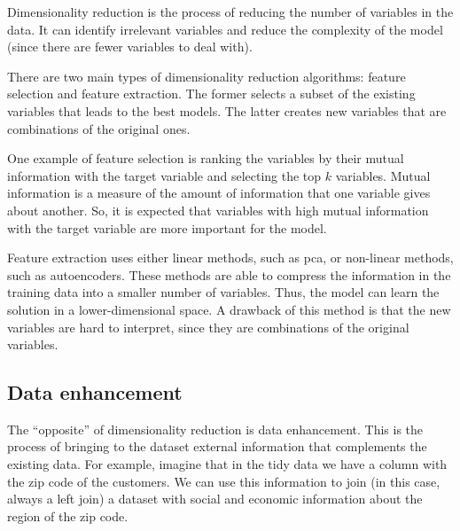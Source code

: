 Dimensionality reduction is the process of reducing the number of variables in the data.
It can identify irrelevant variables and reduce the complexity of the model (since there
are fewer variables to deal with).


There are two main types of dimensionality reduction algorithms: feature selection and
feature extraction.  The former selects a subset of the existing variables that leads
to the best models.  The latter creates new variables that are combinations
of the original ones.


One example of feature selection is ranking the variables by their mutual information with
the target variable and selecting the top $k$ variables.  Mutual information is a measure
of the amount of information that one variable gives about another.  So, it is expected
that variables with high mutual information with the target variable are more important
for the model.

Feature extraction uses either linear methods, such as \gls{pca}, or non-linear methods,
such as autoencoders.  These methods are able to compress the information in the training
data into a smaller number of variables.  Thus, the model can learn the solution in
a lower-dimensional space.  A drawback of this method is that the new variables are
hard to interpret, since they are combinations of the original variables.

\subsection{Data enhancement}

The ``opposite'' of dimensionality reduction is data enhancement.  This is the process of
bringing to the dataset external information that complements the existing data.  For
example, imagine that in the tidy data we have a column with the zip code of the
customers.  We can use this information to join (in this case, always a left join) a
dataset with social and economic information about the region of the zip code.

